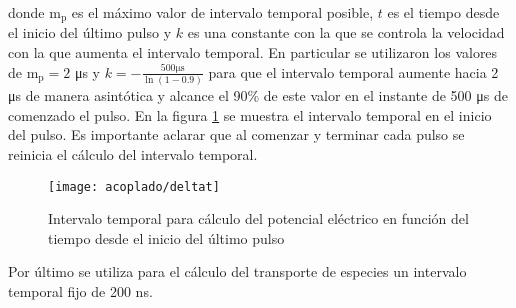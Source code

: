 donde $\mathrm{m_p}$ es el máximo valor de intervalo temporal posible, $t$ es el tiempo desde el inicio del último pulso y $k$ es una constante con la que se controla la velocidad con la que aumenta el intervalo temporal. En particular se utilizaron los valores de $\mathrm{m_p} = 2$ \si{\micro\second} y $k = -\frac{500 \si{\micro\second}}{\ln (1 - 0.9)}$ para que el intervalo temporal aumente hacia 2 \si{\micro\second} de manera asintótica y alcance el 90\% de este valor en el instante de 500 \si{\micro\second} de comenzado el pulso. En la figura \ref{fig:deltat} se muestra el intervalo temporal en el inicio del pulso. Es importante aclarar que al comenzar y terminar cada pulso se reinicia el cálculo del intervalo temporal.

\begin{figure}
	\centering
	\texttt{[image: acoplado/deltat]}
	\caption{Intervalo temporal para cálculo del potencial eléctrico en función del tiempo desde el inicio del último pulso}
	\label{fig:deltat}
\end{figure}

Por último se utiliza para el cálculo del transporte de especies un intervalo temporal fijo de 200 \si{\nano\second}.



